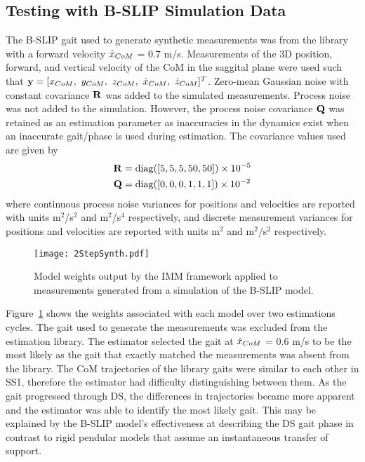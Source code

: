 \subsection{Testing with B-SLIP Simulation Data}

The B-SLIP gait used to generate synthetic measurements was from the library with a forward velocity $ \dot{x}_{CoM} $ = 0.7 m/s. Measurements of the 3D position, forward, and vertical velocity of the CoM in the saggital plane were used such that $ \y = [x_{\com},\ y_{\com},\ z_{\com},\ \dot{x}_{\com},\ \dot{z}_{\com}]^T $. Zero-mean Gaussian noise with constant covariance $ \mathbf{R} $ was added to the simulated measurements. Process noise was not added to the simulation. However, the process noise covariance $ \mathbf{Q} $ was retained as an estimation parameter as inaccuracies in the dynamics exist when an inaccurate gait/phase is used during estimation. The covariance values used are given by
\begin{align}
	\mathbf{R} &= {\rm diag}([5 ,5 ,5  ,50 ,50]) 
\times 10^{-5} \\
\mathbf{Q} &={\rm diag}([0,0,0,1,1,1])
\times 10^{-2}
\end{align}
where continuous process noise variances for positions and velocities are reported with units m${}^2$/s${}^2$ and m${}^2$/s${}^4$ respectively, and discrete measurement variances for positions and velocities are reported with units m${}^2 $ and m${}^2$/s${}^2$ respectively. 

\begin{figure}
	\centering
	\texttt{[image: 2StepSynth.pdf]}
	\caption{Model weights output by the IMM framework applied to measurements generated from a simulation of the B-SLIP model.}\label{fig:weightSyn}
\end{figure}

Figure~\ref{fig:weightSyn} shows the weights associated with each model over two estimations cycles. The gait used to generate the measurements was excluded from the estimation library. The estimator selected the gait at $ \dot{x}_{CoM} $ = 0.6 m/s to be the most likely as the gait that exactly matched the measurements was absent from the library. The CoM trajectories of the library gaits were similar to each other in SS1, therefore the estimator had difficulty distinguishing between them. As the gait progressed through DS, the differences in trajectories became more apparent and the estimator was able to identify the most likely gait. This may be explained by the B-SLIP model's effectiveness at describing the DS gait phase in contrast to rigid pendular models that assume an instantaneous transfer of support.

